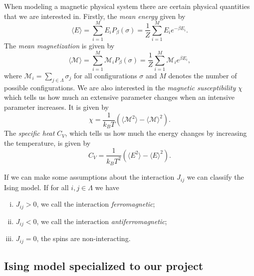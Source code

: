 When modeling a magnetic physical system there are certain physical quantities
that we are interested in. Firstly, the \emph{mean energy} given by
\begin{equation}
  \label{eq:mean energy}
  \langle E \rangle = \sum^{M}_{i=1} E_i P_\beta(\sigma) = \frac{1}{Z} \sum^{M}_{i=1} E_i e^{-\beta E_i}.
\end{equation}
The \emph{mean magnetization} is given by
\begin{equation}
  \label{eq:mean magnetization}
  \langle \mathcal{M} \rangle = \sum^{M}_{i=1} \mathcal{M}_i P_\beta(\sigma) =\frac{1}{Z} \sum^{M}_{i=1} \mathcal{M}_i e^{\beta E_i},
\end{equation}
where $\mathcal{M}_i = \sum^{}_{j \in \Lambda}\sigma_j$ for all configurations
$\sigma$ and $M$ denotes the number of possible configurations.  We are also
interested in the \emph{magnetic susceptibility} $\chi$ which tells us how much
an extensive parameter changes when an intensive parameter increases. It is
given by
\begin{equation}
  \label{eq:magnetic susceptibility}
  \chi = \frac{1}{k_BT}\left( \langle \mathcal{M}^2 \rangle - \langle \mathcal{M} \rangle^2 \right).
\end{equation}
The \emph{specific heat} $C_V$, which tells us how much the energy changes by
increasing the temperature, is given by
\begin{equation}
  \label{eq:specific heat}
  C_V = \frac{1}{k_BT^2} \left( \langle E^2 \rangle - \langle E \rangle ^2 \right).
\end{equation}

If we can make some assumptions about the interaction $J_{ij}$ we can classify
the Ising model.  If for all $i, j \in \Lambda$ we have
\begin{enumerate}[i)]
  \item $J_{ij} > 0$, we call the interaction \emph{ferromagnetic};
  \item $J_{ij} < 0$, we call the interaction \emph{antiferromagnetic};
  \item $J_{ij} = 0$, the spins are non-interacting.
\end{enumerate}

\subsection{Ising model specialized to our project}

